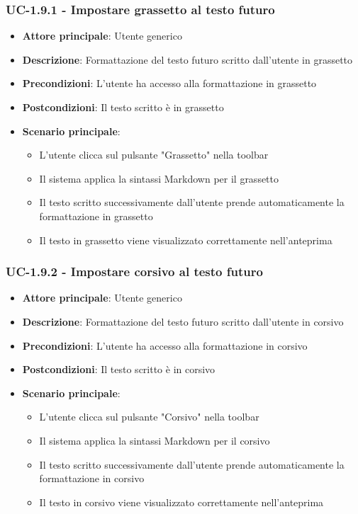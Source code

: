 \documentclass[11pt,a4paper]{article}
\begin{document}
\subsubsection{UC-1.9.1 - Impostare grassetto al testo futuro}
\begin{itemize}
    \item \textbf{Attore principale}: Utente generico
    \item \textbf{Descrizione}: Formattazione del testo futuro scritto dall’utente in grassetto
    \item \textbf{Precondizioni}: L’utente ha accesso alla formattazione in grassetto
    \item \textbf{Postcondizioni}: Il testo scritto è in grassetto
    \item \textbf{Scenario principale}:
        \begin{itemize}
            \item L’utente clicca sul pulsante "Grassetto" nella toolbar
            \item Il sistema applica la sintassi Markdown per il grassetto
            \item Il testo scritto successivamente dall'utente prende automaticamente la formattazione in grassetto
            \item Il testo in grassetto viene visualizzato correttamente nell'anteprima
        \end{itemize}
\end{itemize}

\subsubsection{UC-1.9.2 - Impostare corsivo al testo futuro}
\begin{itemize}
    \item \textbf{Attore principale}: Utente generico
    \item \textbf{Descrizione}: Formattazione del testo futuro scritto dall’utente in corsivo
    \item \textbf{Precondizioni}: L’utente ha accesso alla formattazione in corsivo
    \item \textbf{Postcondizioni}: Il testo scritto è in corsivo
    \item \textbf{Scenario principale}:
        \begin{itemize}
            \item L’utente clicca sul pulsante "Corsivo" nella toolbar
            \item Il sistema applica la sintassi Markdown per il corsivo
            \item Il testo scritto successivamente dall'utente prende automaticamente la formattazione in corsivo
            \item Il testo in corsivo viene visualizzato correttamente nell'anteprima
        \end{itemize}
\end{itemize}
\end{document}
